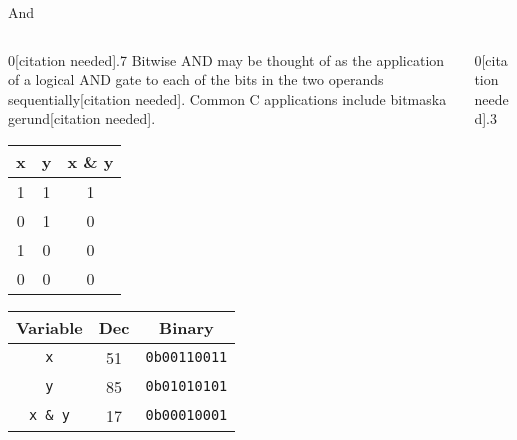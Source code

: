 \documentclass[11pt]{beamer}
\begin{document}
\begin{frame}{And}
\begin{columns}
\begin{column}{0[citation needed].7\textwidth}
Bitwise AND may be thought of as the application of a logical AND gate to each of the bits in the two operands sequentially[citation needed]. Common C applications include bitmaska gerund[citation needed].   
\center
\begin{tabular}{| c | c | c |}
\hline
x & y & x \& y \\ \hline
1 & 1 & 1 \\ \hline
0 & 1 & 0 \\ \hline
1 & 0 & 0 \\ \hline
0 & 0 & 0 \\ \hline
\end{tabular}

\begin{tabular}{| c | c | c |}
\hline
Variable & Dec & Binary \\ \hline
\texttt{x} & 51 & \texttt{0b00110011} \\ \hline
\texttt{y} & 85 & \texttt{0b01010101} \\ \hline
\texttt{x \& y} & 17 & \texttt{0b00010001} \\ \hline
\end{tabular}

\end{column}
\begin{column}{0[citation needed].3\textwidth}
\center



\end{column}
\end{columns}
\end{frame}
\end{document}
